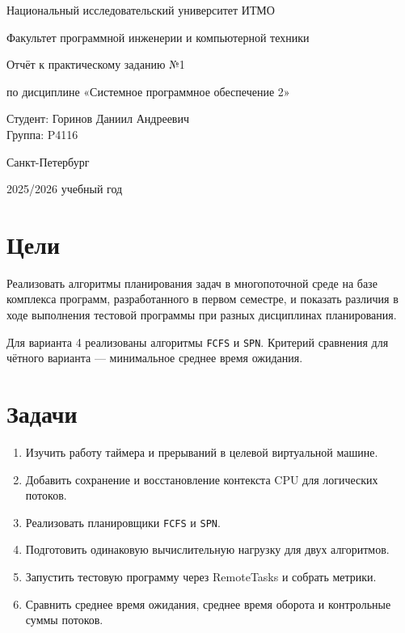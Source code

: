 \documentclass[a4paper,12pt]{article}
\begin{document}
\begin{titlepage}
\centering
{\large Национальный исследовательский университет ИТМО\par}
{\large Факультет программной инженерии и компьютерной техники\par}
\vspace{4cm}
{\large Отчёт к практическому заданию №1\par}
{\large по дисциплине «Системное программное обеспечение 2»\par}
\vfill
\begin{flushright}
Студент: Горинов Даниил Андреевич\\
Группа: P4116
\end{flushright}
\vfill
{Санкт-Петербург}\par
{2025/2026 учебный год\par}
\end{titlepage}

\clearpage
{}

\section{Цели}
Реализовать алгоритмы планирования задач в многопоточной среде на базе комплекса программ, разработанного в первом семестре, и показать различия в ходе выполнения тестовой программы при разных дисциплинах планирования.

Для варианта 4 реализованы алгоритмы \texttt{FCFS} и \texttt{SPN}. Критерий сравнения для чётного варианта — минимальное среднее время ожидания.

\section{Задачи}
\begin{enumerate}
\item Изучить работу таймера и прерываний в целевой виртуальной машине.
\item Добавить сохранение и восстановление контекста CPU для логических потоков.
\item Реализовать планировщики \texttt{FCFS} и \texttt{SPN}.
\item Подготовить одинаковую вычислительную нагрузку для двух алгоритмов.
\item Запустить тестовую программу через RemoteTasks и собрать метрики.
\item Сравнить среднее время ожидания, среднее время оборота и контрольные суммы потоков.
\end{enumerate}
\end{document}
